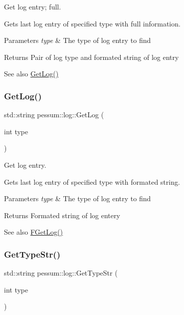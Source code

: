 Get log entry; full. 

Gets last log entry of specified type with full information. 
\begin{DoxyParams}{Parameters}
{\em type} & The type of log entry to find \\
\hline
\end{DoxyParams}
\begin{DoxyReturn}{Returns}
Pair of log type and formated string of log entry 
\end{DoxyReturn}
\begin{DoxySeeAlso}{See also}
\hyperlink{namespacepessum_1_1log_abfb7da9bcd4948bc24112a88417d272a}{Get\+Log()} 
\end{DoxySeeAlso}
\mbox{\label{namespacepessum_1_1log_abfb7da9bcd4948bc24112a88417d272a}} 
\subsubsection{\texorpdfstring{Get\+Log()}{GetLog()}}
{\footnotesize\ttfamily std\+::string pessum\+::log\+::\+Get\+Log (\begin{DoxyParamCaption}\item[{int}]{type }\end{DoxyParamCaption})}



Get log entry. 

Gets last log entry of specified type with formated string. 
\begin{DoxyParams}{Parameters}
{\em type} & The type of log entry to find \\
\hline
\end{DoxyParams}
\begin{DoxyReturn}{Returns}
Formated string of log entery 
\end{DoxyReturn}
\begin{DoxySeeAlso}{See also}
\hyperlink{namespacepessum_1_1log_af90cce6e7194fdefd3c665aba4195830}{F\+Get\+Log()} 
\end{DoxySeeAlso}
\mbox{\label{namespacepessum_1_1log_a399df8bb8a0d02825ace8797daf286f6}} 
\subsubsection{\texorpdfstring{Get\+Type\+Str()}{GetTypeStr()}}
{\footnotesize\ttfamily std\+::string pessum\+::log\+::\+Get\+Type\+Str (\begin{DoxyParamCaption}\item[{int}]{type }\end{DoxyParamCaption})}



